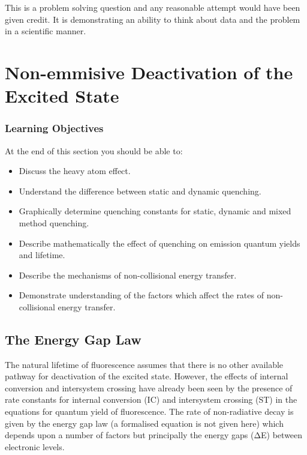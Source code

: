 \documentclass[
]{book}
\providecommand{\tightlist}{%
  \setlength{\itemsep}{0pt}\setlength{\parskip}{0pt}}
\begin{document}
This is a problem solving question and any reasonable attempt would have been given credit. It is demonstrating an ability to think about data and the problem in a scientific manner.

\hypertarget{ch:Quench}{%
\chapter{Non-emmisive Deactivation of the Excited State}\label{ch:Quench}}

\hypertarget{sec:QuenchLOs}{%
\subsection{Learning Objectives}\label{sec:QuenchLOs}}

At the end of this section you should be able to:

\begin{itemize}
\tightlist
\item
  Discuss the heavy atom effect.
\item
  Understand the difference between static and dynamic quenching.
\item
  Graphically determine quenching constants for static, dynamic and mixed method quenching.
\item
  Describe mathematically the effect of quenching on emission quantum yields and lifetime.
\item
  Describe the mechanisms of non-collisional energy transfer.
\item
  Demonstrate understanding of the factors which affect the rates of non-collisional energy transfer.
\end{itemize}

\hypertarget{sec:energygap}{%
\section{The Energy Gap Law}\label{sec:energygap}}

The natural lifetime of fluorescence assumes that there is no other available pathway for deactivation of the excited state. However, the effects of internal conversion and intersystem crossing have already been seen by the presence of rate constants for internal conversion (IC) and intersystem crossing (ST) in the equations for quantum yield of fluorescence. The rate of non-radiative decay is given by the energy gap law (a formalised equation is not given here) which depends upon a number of factors but principally the energy gaps (ΔE) between electronic levels.
\end{document}
